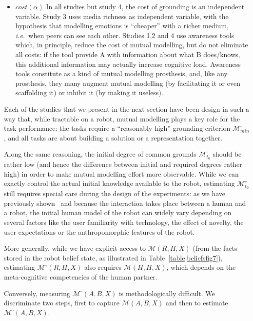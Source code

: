 \documentclass[twocolumn]{article}
\newcommand{\ie}{{\textit{i.e.\ }}}
\newcommand{\model}[3]{{$\mathcal{M}(#1, #2, #3)$}}
\newcommand{\Model}[3]{{$\mathcal{M}^{\circ}(#1, #2, #3)$}}
\newcommand{\groundingcriterion}{{$\mathcal{M}^{\circ}_{min}$}}
\newcommand{\inigrounding}{{$\mathcal{M}^{\circ}_{t_0}$}}
\begin{document}
\begin{itemize}
    \item $cost(\alpha)$ In all studies but study 4, the cost of  grounding is
        an independent variable. Study 3 uses media richness as independent
        variable, with the hypothesis that modelling emotions is ``cheaper'' with a
        richer medium, \ie  when peers can see each other.  Studies 1,2 and 4
        use awareness tools which, in principle, reduce the cost of mutual modelling, but do
        not eliminate all costs: if the tool provide A with information about
        what B does/knows, this additional information may actually increase
        cognitive load. Awareness tools constitute as a kind of mutual modelling prosthesis,
        and, like any prosthesis, they many augment mutual modelling (by facilitating it or
        even scaffolding it) or inhibit it (by making it useless).

\end{itemize}


Each of the studies that we present in the next section have been design in such
a way that, while tractable on a robot, mutual modelling plays a key role for
the task performance: the tasks require a ``reasonably high'' grounding
criterion \groundingcriterion, and all tasks are about building a solution or a
representation together.

Along the same reasoning, the initial degree of common grounds \inigrounding
should be rather low (and hence the difference between initial and required
degrees rather high) in order to make mutual modelling effort more observable.
While we can exactly control the actual initial knowledge available to the
robot, estimating \inigrounding still requires special care during the design of
the experiments: as we have previously shown~\citep{lemaignan2014dynamics,
lemaignan2014cognitive} and because the interaction takes place between a human and
a robot, the initial human model of the robot can widely vary depending on
several factors like the user familiarity with technology, the effect of
novelty, the user expectations or the anthropomorphic features of the robot.

More generally, while we have explicit access to \model{R}{H}{X} (from the facts
stored in the robot belief state, as illustrated in
Table~\ref{table|beliefsfig7}), estimating \Model{R}{H}{X} also requires
\model{H}{H}{X}, which depends on the meta-cognitive competencies of the human
partner.

Conversely, measuring \Model{A}{B}{X} is methodologically difficult. We
discriminate two steps, first to capture \model{A}{B}{X} and then to
estimate \Model{A}{B}{X}. 
\end{document}
